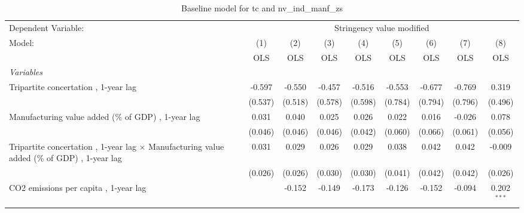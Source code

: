 
\begin{table}[htbp]
   \caption{Baseline model for tc and nv\_ind\_manf\_zs}
   \centering
   \begin{tabular}{lcccccccc}
      \toprule
      Dependent Variable: & \multicolumn{8}{c}{Stringency value modified}\\
      Model:                                                                                             & (1)     & (2)     & (3)         & (4)          & (5)           & (6)           & (7)          & (8)\\  
                                                                                                         &  OLS    & OLS     & OLS         & OLS          & OLS           & OLS           & OLS          & OLS\\  
      \midrule
      \emph{Variables}\\
      Tripartite concertation , 1-year lag                                                               & -0.597  & -0.550  & -0.457      & -0.516       & -0.553        & -0.677        & -0.769       & 0.319\\   
                                                                                                         & (0.537) & (0.518) & (0.578)     & (0.598)      & (0.784)       & (0.794)       & (0.796)      & (0.496)\\   
      Manufacturing value added (\% of GDP) , 1-year lag                                                 & 0.031   & 0.040   & 0.025       & 0.026        & 0.022         & 0.016         & -0.026       & 0.078\\   
                                                                                                         & (0.046) & (0.046) & (0.046)     & (0.042)      & (0.060)       & (0.066)       & (0.061)      & (0.056)\\   
      Tripartite concertation , 1-year lag $\times$ Manufacturing value added (\% of GDP) , 1-year lag   & 0.031   & 0.029   & 0.026       & 0.029        & 0.038         & 0.042         & 0.042        & -0.009\\   
                                                                                                         & (0.026) & (0.026) & (0.030)     & (0.030)      & (0.041)       & (0.042)       & (0.042)      & (0.026)\\   
      CO2 emissions per capita , 1-year lag                                                              &         & -0.152  & -0.149      & -0.173       & -0.126        & -0.152        & -0.094       & 0.202$^{***}$\\   

\end{tabular}
\end{table}
